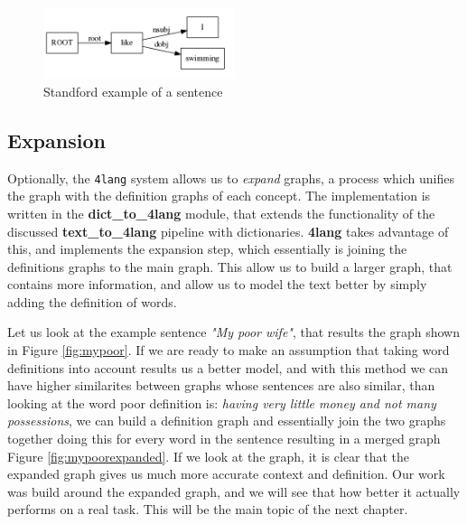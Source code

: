 \begin{figure}[h]
	\centering
	\includegraphics[width=0.5\textwidth]{figures/swimmingdep}
	\caption{Standford example of a sentence}
	\label{fig:swimmingdep}
\end{figure}


\subsection{Expansion}
Optionally, the \texttt{4lang} system allows us to \textit{expand}
graphs, a process which unifies the graph with the definition graphs of
each concept. The implementation is written in the \textbf{dict\_to\_4lang} module, that extends the functionality of the discussed \textbf{text\_to\_4lang} pipeline with dictionaries. \textbf{4lang} takes advantage of this, and implements the expansion step, which essentially is joining the definitions graphs to the main graph. This allow us to build a larger graph, that contains more information, and allow us to model the text better by simply adding the definition of words.

Let us look at the example sentence \textit{"My poor wife"}, that results the graph shown in Figure \ref{fig:mypoor}. If we are ready to make an assumption that taking word definitions into account results us a better model, and with this method we can have higher similarites between graphs whose sentences are also similar, than looking at the word poor definition is: \textit{having very little money and not many possessions}, we can build a definition graph and essentially join the two graphs together doing this for every word in the sentence resulting in a merged graph Figure \ref{fig:mypoorexpanded}. If we look at the graph, it is clear that the expanded graph gives us much more accurate context and definition. Our work was build around the expanded graph, and we will see that how better it actually performs on a real task. This will be the main topic of the next chapter.


